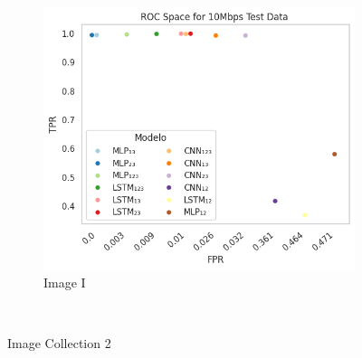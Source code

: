 \documentclass[a4paper,fleqn]{cas-sc}
\begin{document}
\begin{figure}
\begin{minipage}[t]{0.46\textwidth}
			~
			\begin{subfigure}[t]{0.33\textwidth}
				\includegraphics[draft=false, width=\textwidth]{./figs/ROC-Space-Test-Data-10Mbps.png} 
				\caption{Image I}
				\label{fig:1c}
			\end{subfigure}%
			~
			\hfill
			\caption{Image Collection 2\hspace{10cm}}
			\label{fig:2}
		\end{minipage}
	
	\end{figure}
	

	
	
\end{document}
